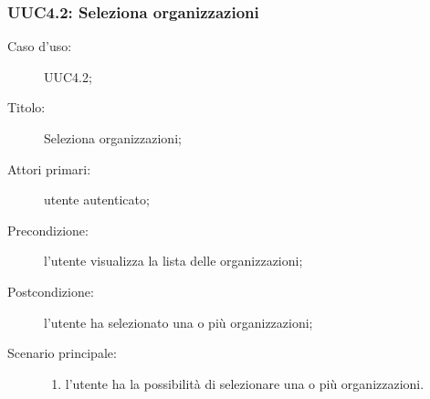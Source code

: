 \documentclass[../../../analisi-dei-requisiti.tex]{subfiles}
\begin{document}
\subsubsection{UUC4.2: Seleziona organizzazioni}%
\label{subs:UUC4.1}
\begin{description}
  \item[Caso d’uso:] UUC4.2;
  \item[Titolo:] Seleziona organizzazioni;
  \item[Attori primari:] utente autenticato;
  \item[Precondizione:] l'utente visualizza la lista delle organizzazioni;
  \item[Postcondizione:] l'utente ha selezionato una o più organizzazioni;
  \item[Scenario principale:]
        \begin{enumerate}
          \item l'utente ha la possibilità di selezionare una o più organizzazioni.
        \end{enumerate}
\end{description}
\end{document}
